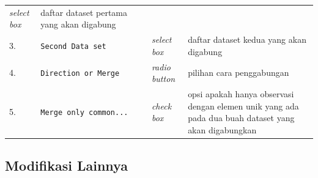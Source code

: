 \documentclass[12pt,]{krantz}
\begin{document}
\begin{longtable}[]{@{}llll@{}}
\begin{minipage}[t]{0.09\columnwidth}
\emph{select box}\strut
\end{minipage} & \begin{minipage}[t]{0.60\columnwidth}\raggedright
daftar dataset pertama yang akan digabung\strut
\end{minipage}\tabularnewline
\begin{minipage}[t]{0.04\columnwidth}\raggedright
3.\strut
\end{minipage} & \begin{minipage}[t]{0.15\columnwidth}\raggedright
\texttt{Second\ Data\ set}\strut
\end{minipage} & \begin{minipage}[t]{0.09\columnwidth}\raggedright
\emph{select box}\strut
\end{minipage} & \begin{minipage}[t]{0.60\columnwidth}\raggedright
daftar dataset kedua yang akan digabung\strut
\end{minipage}\tabularnewline
\begin{minipage}[t]{0.04\columnwidth}\raggedright
4.\strut
\end{minipage} & \begin{minipage}[t]{0.15\columnwidth}\raggedright
\texttt{Direction\ or\ Merge}\strut
\end{minipage} & \begin{minipage}[t]{0.09\columnwidth}\raggedright
\emph{radio button}\strut
\end{minipage} & \begin{minipage}[t]{0.60\columnwidth}\raggedright
pilihan cara penggabungan\strut
\end{minipage}\tabularnewline
\begin{minipage}[t]{0.04\columnwidth}\raggedright
5.\strut
\end{minipage} & \begin{minipage}[t]{0.15\columnwidth}\raggedright
\texttt{Merge\ only\ common...}\strut
\end{minipage} & \begin{minipage}[t]{0.09\columnwidth}\raggedright
\emph{check box}\strut
\end{minipage} & \begin{minipage}[t]{0.60\columnwidth}\raggedright
opsi apakah hanya observasi dengan elemen unik yang ada pada dua buah dataset yang akan digabungkan\strut
\end{minipage}\tabularnewline
\bottomrule
\end{longtable}

\hypertarget{modifikasi-lainnya}{%
\subsection{Modifikasi Lainnya}\label{modifikasi-lainnya}}
\end{document}
